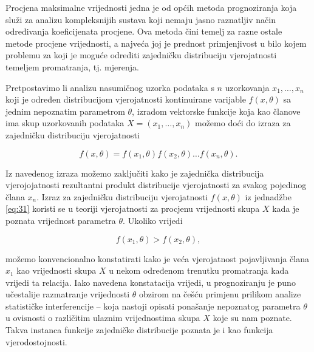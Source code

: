\documentclass[a4paper,12pt,oneside]{memoir}
\begin{document}
                Procjena maksimalne vrijednosti jedna je od općih metoda prognoziranja koja služi za analizu kompleksnijih sustava koji nemaju jasno raznatljiv način određivanja koeficijenata procjene. Ova metoda čini temelj za razne ostale metode procjene vrijednosti, a najveća joj je prednost primjenjivost u bilo kojem problemu za koji je moguće odrediti zajedničku distribuciju vjerojatnosti temeljem promatranja, tj. mjerenja.

                Pretpostavimo li analizu nasumičnog uzorka podataka s $n$ uzorkovanja $x_1,\ldots,x_n$ koji je određen distribucijom vjerojatnosti kontinuirane varijable $f(x,\theta)$ sa jednim nepoznatim parametrom $\theta$, izradom vektorske funkcije koja kao članove ima skup uzorkovanih podataka $X=(x_1,\ldots,x_n)$ možemo doći do izraza za zajedničku distribuciju vjerojatnosti \cite{Priestley}

                \begin{equation}
                    f(x,\theta)=f(x_1,\theta)f(x_2,\theta)\ldots f(x_n,\theta).
                    \label{eq:31}
                \end{equation}

                Iz navedenog izraza možemo zaključiti kako je zajednička distribucija vjerojojatnosti rezultantni produkt distribucije vjerojatnosti za svakog pojedinog člana $x_n$. Izraz za zajedničku distribuciju vjerojatnosti $f(x,\theta)$ iz jednadžbe \eqref{eq:31} koristi se u teoriji vjerojatnosti za procjenu vrijednosti skupa $X$ kada je poznata vrijednost parametra $\theta$. Ukoliko vrijedi

                \begin{equation}
                    f(x_1,\theta)> f(x_2,\theta),
                    \label{eq:32}
                \end{equation}

                možemo konvencionalno konstatirati kako je veća vjerojatnost pojavljivanja člana $x_1$ kao vrijednosti skupa $X$ u nekom određenom trenutku promatranja kada vrijedi ta relacija. Iako navedena konstatacija vrijedi, u prognoziranju je puno učestalije razmatranje vrijednosti $\theta$ obzirom na češću primjenu prilikom analize statističke interferencije -- koja nastoji opisati ponašanje nepoznatog parametra $\theta$ u ovisnosti o različitim ulaznim vrijednostima skupa $X$ koje su nam poznate. Takva instanca funkcije zajedničke distribucije poznata je i kao funkcija vjerodostojnosti.
                
\end{document}
